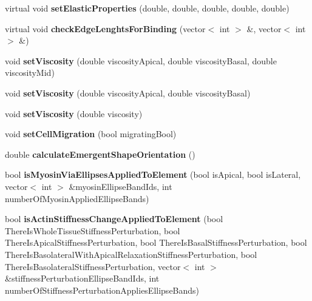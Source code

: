 \begin{DoxyCompactItemize}
\item 
\hypertarget{classShapeBase_aac3988352864bd06d7509b74977320d8}{}virtual void {\bfseries set\+Elastic\+Properties} (double, double, double, double, double)\label{classShapeBase_aac3988352864bd06d7509b74977320d8}

\item 
\hypertarget{classShapeBase_a87220daf74d141bc3073e256721f1336}{}virtual void {\bfseries check\+Edge\+Lenghts\+For\+Binding} (vector$<$ int $>$ \&, vector$<$ int $>$ \&)\label{classShapeBase_a87220daf74d141bc3073e256721f1336}

\item 
\hypertarget{classShapeBase_ac4e051a82edb9b987edfbd783076e348}{}void {\bfseries set\+Viscosity} (double viscosity\+Apical, double viscosity\+Basal, double viscosity\+Mid)\label{classShapeBase_ac4e051a82edb9b987edfbd783076e348}

\item 
\hypertarget{classShapeBase_a8b6ffc8d699795e4efb867efd065a679}{}void {\bfseries set\+Viscosity} (double viscosity\+Apical, double viscosity\+Basal)\label{classShapeBase_a8b6ffc8d699795e4efb867efd065a679}

\item 
\hypertarget{classShapeBase_ae17e8a052b0a2bf5b11f6d5498d61923}{}void {\bfseries set\+Viscosity} (double viscosity)\label{classShapeBase_ae17e8a052b0a2bf5b11f6d5498d61923}

\item 
\hypertarget{classShapeBase_a2823ab0e017445a2341898d40da167ec}{}void {\bfseries set\+Cell\+Migration} (bool migrating\+Bool)\label{classShapeBase_a2823ab0e017445a2341898d40da167ec}

\item 
\hypertarget{classShapeBase_a3eecbff8db98871f4b5f1ee0992f3d6d}{}double {\bfseries calculate\+Emergent\+Shape\+Orientation} ()\label{classShapeBase_a3eecbff8db98871f4b5f1ee0992f3d6d}

\item 
\hypertarget{classShapeBase_aaee2f3787e29bc671732e59e8589a634}{}bool {\bfseries is\+Myosin\+Via\+Ellipses\+Applied\+To\+Element} (bool is\+Apical, bool is\+Lateral, vector$<$ int $>$ \&myosin\+Ellipse\+Band\+Ids, int number\+Of\+Myosin\+Applied\+Ellipse\+Bands)\label{classShapeBase_aaee2f3787e29bc671732e59e8589a634}

\item 
\hypertarget{classShapeBase_adc6d308163a1f09f654008a7b91e5b0a}{}bool {\bfseries is\+Actin\+Stiffness\+Change\+Applied\+To\+Element} (bool There\+Is\+Whole\+Tissue\+Stiffness\+Perturbation, bool There\+Is\+Apical\+Stiffness\+Perturbation, bool There\+Is\+Basal\+Stiffness\+Perturbation, bool There\+Is\+Basolateral\+With\+Apical\+Relaxation\+Stiffness\+Perturbation, bool There\+Is\+Basolateral\+Stiffness\+Perturbation, vector$<$ int $>$ \&stiffness\+Perturbation\+Ellipse\+Band\+Ids, int number\+Of\+Stiffness\+Perturbation\+Applies\+Ellipse\+Bands)\label{classShapeBase_adc6d308163a1f09f654008a7b91e5b0a}


\end{DoxyCompactItemize}
